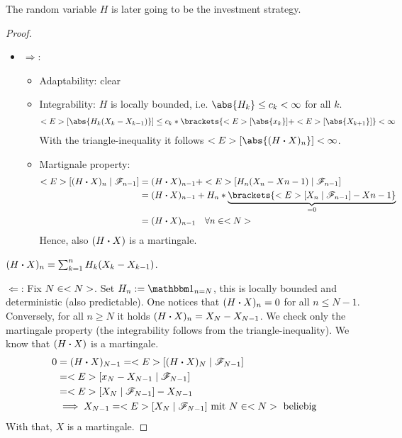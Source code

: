 \begin{*remark}
	The random variable $H$ is later going to be the investment strategy. 
\end{*remark}
\begin{proof}
	\begin{itemize}
		\item $\Rightarrow$:
		\begin{itemize}
			\item Adaptability: clear
			\item Integrability: $H$ is locally bounded, i.e. $\abs{H_k} \le c_k < \infty$ for all $k$.
			\begin{align*}
			\E[\abs{H_k (X_k - X_{k-1})}] \le c_k * \brackets{\E[\abs{x_k}] + \E[\abs{X_{k+1}}]} < \infty
			\end{align*}
			With the triangle-inequality it follows $\E[\abs{(H \bigcdot X)_n}] < \infty$.
			\item Martignale property:
			\begin{align*}
			\E[(H \bigcdot X)_n \mid \F_{n-1}] &= (H \bigcdot X)_{n-1} + \E[H_n (X_n - X{n-1}) \mid \F_{n-1}]\\
			&=  (H \bigcdot X)_{n-1} + H_n * \underbrace{\brackets{\E[X_n \mid \F_{n-1}] - X{n-1}}}_{=0}\\ 
			&=(H \bigcdot X)_{n-1} \quad \forall n \in \N
			\end{align*}
			Hence, also $(H \boldsymbol{\cdot} X)$ is a martingale. 	
		\end{itemize}
	\end{itemize} $(H \boldsymbol{\cdot} X)_n = \sum_{k=1}^n H_k (X_k - X_{k-1})$.
	\item $\Leftarrow$: Fix $N \in <N>$. Set $H_n := \indi_{n = N}$, this is locally bounded and deterministic (also predictable). One notices that $(H \boldsymbol{\cdot} X)_n = 0$  for all $n \le N-1$. Conversely, for all $n \ge N$ it holds $(H \boldsymbol{\cdot} X)_n = X_N - X_{N-1}$. We check only the martingale property (the integrability follows from the triangle-inequality). We know that $(H \boldsymbol{\cdot} X)$ is a martingale. 
	\begin{align*}
	0 &= (H \boldsymbol{\cdot} X)_{N-1} = <E>[(H \boldsymbol{\cdot} X)_N \mid \mathscr F_{N-1}]\\
	 &= <E>[x_N - X_{N-1} \mid \mathscr F_{N-1}]\\ 
	 &= <E>[X_N \mid \mathscr F_{N-1}] - X_{N-1}\\
	&\implies X_{N-1} = <E>[X_N \mid \mathscr F_{N-1}] \text{ mit } N \in <N> \text{ beliebig}
	\end{align*}
	With that, $X$ is a martingale. 
\end{proof}
